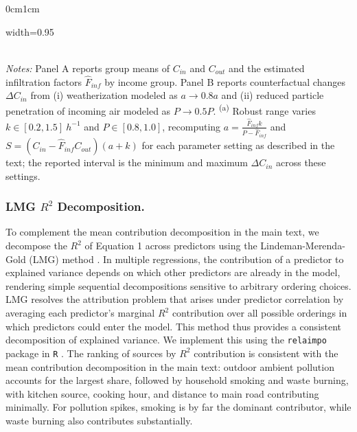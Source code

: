 \documentclass[9pt,twoside]{pnas-new}
\begin{document}
\begin{adjustwidth}{0cm}{1cm}
\begin{table}[!h]
    \caption{Back-of-the-envelope calculations of the effect of weatherization (reducing $a$) and reduced particle penetration of incoming air (reducing $P$) on indoor PM$_{2.5}$ concentrations.}
    \label{SI_BoE_table}

\begin{adjustbox}{width=0.95\linewidth}   %
  
\end{adjustbox}
\\
  {\footnotesize \textit{Notes:} Panel A reports group means of $C_{in}$ and $C_{out}$ and the estimated infiltration factors $\hat F_{inf}$ by income group. Panel B reports counterfactual changes $\Delta C_{in}$ from (i) weatherization modeled as $a \rightarrow 0.8a$ and (ii) reduced particle penetration of incoming air modeled as $P \rightarrow 0.5P$. \textsuperscript{(a)} Robust range varies $k \in [0.2,1.5]~h^{-1}$ and $P \in [0.8,1.0]$, recomputing $a=\frac{\hat F_{inf}k}{P-\hat F_{inf}}$ and $S=(C_{in}-\hat F_{inf}C_{out})(a+k)$ for each parameter setting as described in the text; the reported interval is the minimum and maximum $\Delta C_{in}$ across these settings.}
\end{table}


\newpage
\subsubsection*{LMG $R^2$ Decomposition.} 
To complement the mean contribution decomposition in the main text, we decompose the $R^2$ of Equation 1 across predictors using the Lindeman-Merenda-Gold (LMG) method \citep{lindeman_introduction_1980}. 
In multiple regressions, the contribution of a predictor to explained variance depends on which other predictors are already in the model, rendering simple sequential decompositions sensitive to arbitrary ordering choices. LMG resolves the attribution problem that arises under predictor correlation by averaging each predictor's marginal $R^2$ contribution over all possible orderings in which predictors could enter the model. This method thus provides a consistent decomposition of explained variance. We implement this using the \texttt{relaimpo} package in \texttt{R} \citep{gromping_relative_2006}. 
The ranking of sources by $R^2$ contribution is consistent with the mean contribution decomposition in the main text: outdoor ambient pollution accounts for the largest share, followed by household smoking and waste burning, with kitchen source, cooking hour, and distance to main road contributing minimally. For pollution spikes, smoking is by far the dominant contributor, while waste burning also contributes substantially.
\begin{table}[!h]
    \centering


\end{table}
\end{adjustwidth}
\end{document}

